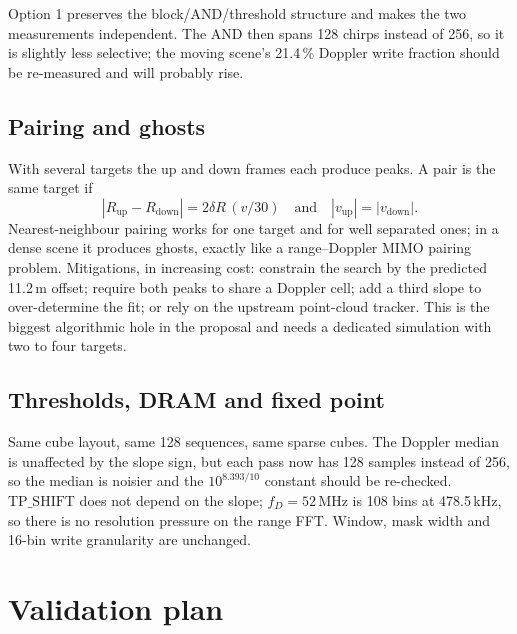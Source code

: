 \documentclass[11pt,a4paper]{article}
\begin{document}
Option 1 preserves the block/AND/threshold structure and makes the two
measurements independent. The AND then spans 128 chirps instead of 256, so it
is slightly less selective; the moving scene's 21.4\,\% Doppler write fraction
should be re-measured and will probably rise.

\subsection{Pairing and ghosts}
With several targets the up and down frames each produce peaks. A pair is the
same target if
\begin{equation}
|R_{\text{up}}-R_{\text{down}}| = 2\delta R\,(v/30) \quad\text{and}\quad
|v_{\text{up}}| = |v_{\text{down}}| .
\end{equation}
Nearest-neighbour pairing works for one target and for well separated ones; in
a dense scene it produces ghosts, exactly like a range--Doppler MIMO pairing
problem. Mitigations, in increasing cost: constrain the search by the predicted
11.2\,m offset; require both peaks to share a Doppler cell; add a third slope
to over-determine the fit; or rely on the upstream point-cloud tracker. This is
the biggest algorithmic hole in the proposal and needs a dedicated simulation
with two to four targets.

\subsection{Thresholds, DRAM and fixed point}
Same cube layout, same 128 sequences, same sparse cubes. The Doppler median is
unaffected by the slope sign, but each pass now has 128 samples instead of 256,
so the median is noisier and the $10^{8.393/10}$ constant should be re-checked.
$\mathrm{TP\_SHIFT}$ does not depend on the slope; $f_D=52$\,MHz is 108 bins at
478.5\,kHz, so there is no resolution pressure on the range FFT. Window, mask
width and 16-bin write granularity are unchanged.

\section{Validation plan}
\end{document}
